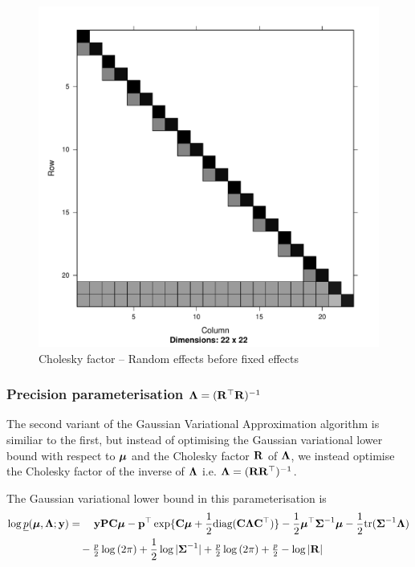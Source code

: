	\begin{figure}[p]
		\includegraphics[width=0.95 \textwidth]{mZ_mX_cholesky.pdf}
		\caption{\tiny Cholesky factor -- Random effects before fixed effects}
		\label{fig:cholrandomfixed}
	\end{figure}
		
	\subsubsection{Precision parameterisation ${\boldsymbol \Lambda} = ({\bf R}^\top {\bf R})^{-1}$}
			
	\noindent The second variant of the Gaussian Variational Approximation algorithm is similiar to the first, but
	instead of optimising the Gaussian variational lower bound with respect to ${\boldsymbol \mu}$ and the Cholesky factor
	${\bf R}$ of ${\boldsymbol \Lambda}$, we instead optimise the Cholesky factor of the inverse of ${\boldsymbol \Lambda}$ i.e. ${\boldsymbol \Lambda} =
	({\bf R} {\bf R}^\top)^{-1}$.
	
	The Gaussian variational lower bound in this parameterisation is
	\begin{align*}
		\log \underline{p}({\boldsymbol \mu}, {\boldsymbol \Lambda}; {\bf y}) & = \quad {\bf y}{\bf P}{\bf C} {\boldsymbol\mu} - {\bf p}^\top \exp\{{\bf C} {\boldsymbol \mu} + \frac{1}{2} \text{diag}({\bf C} {\boldsymbol \Lambda} {\bf C}^\top)\} - \frac{1}{2} {\boldsymbol \mu}^\top {\boldsymbol\Sigma}^{-1} {\boldsymbol \mu} - \frac{1}{2} \text{tr}{({\boldsymbol\Sigma}^{-1} {\boldsymbol\Lambda})} \\
		                                        & \quad- \tfrac{p}{2} \log{(2 \pi)} + \frac{1}{2} \log{|{\boldsymbol\Sigma}^{-1}|} + \tfrac{p}{2} \log{(2 \pi)} + \tfrac{p}{2} - \log{|{\bf R}|}                                             
	\end{align*}
			
